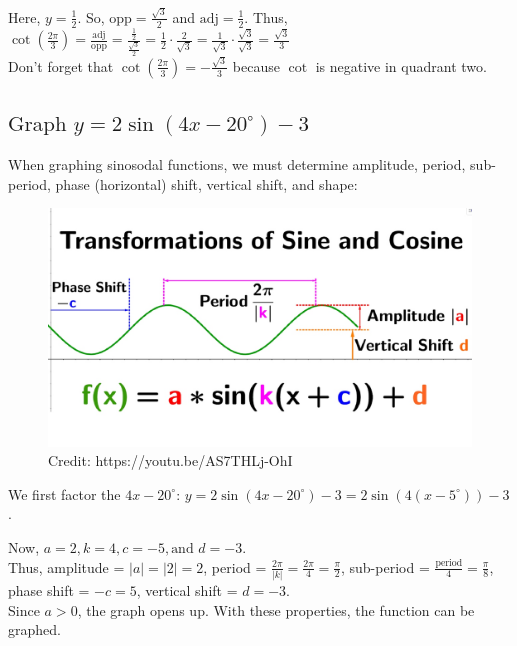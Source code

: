 \documentclass[12pt]{article}
\begin{document}
Here, \(y=\frac{1}{2}\). So, \(\text{opp}=\frac{\sqrt{3}}{2}\) and \(\text{adj}=\frac{1}{2}\). Thus, \(\cot\left( \frac{2\pi}{3}\right) =\frac{\text{adj}}{\text{opp}}=\frac{\frac{1}{2}}{\frac{\sqrt{3}}{2}}=\frac{1}{2}\cdot\frac{2}{\sqrt{3}}=\frac{1}{\sqrt{3}}\cdot\frac{\sqrt{3}}{\sqrt{3}}=\frac{\sqrt{3}}{3}\)\\

Don't forget that \(\cot\left( \frac{2\pi}{3}\right)=-\frac{\sqrt{3}}{3}\) because \(\cot\) is negative in quadrant two.

\subsection{\(\text{Graph } y=2\sin(4x-20^{\circ})-3\)}


When graphing sinosodal functions, we must determine amplitude, period, sub-period, phase (horizontal) shift, vertical shift, and shape:\\

\begin{figure}[H]
	\centering
	\includegraphics[scale=0.2]{maxresdefault.jpg}
	\caption{Credit: https://youtu.be/AS7THLj-OhI}
\end{figure}

We first factor the \(4x-20^{\circ}\): \(y=2\sin(4x-20^{\circ})-3=2\sin(4(x-5^{\circ}))-3\).

Now, \(a=2, k=4, c=-5, \text{and } d=-3\).\\

Thus, amplitude = \(|a|=|2|=2\), period = \(\frac{2\pi}{|k|}=\frac{2\pi}{4}=\frac{\pi}{2}\), sub-period = \(\frac{\text{period}}{4}=\frac{\pi}{8}\), phase shift = \(-c=5\), vertical shift = \(d=-3\).\\

Since \(a>0\), the graph opens up. With these properties, the function can be graphed.\\
\end{document}
